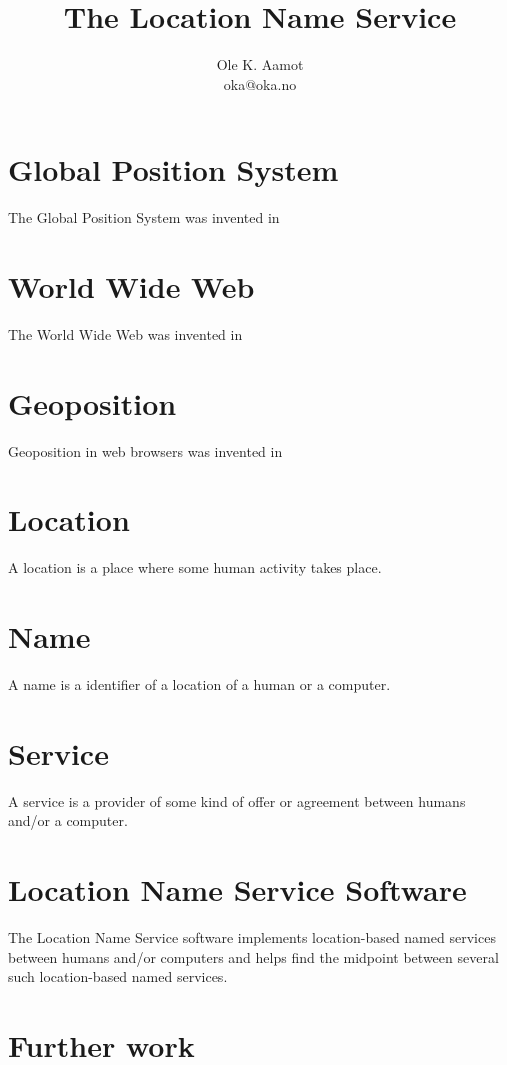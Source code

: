 \documentclass{article}
\begin{document}
\title{The Location Name Service}
\author{Ole K. Aamot\\oka@oka.no}
\section{Global Position System}
The Global Position System was invented in 
\section{World Wide Web}
The World Wide Web was invented in 
\section{Geoposition}
Geoposition in web browsers was invented in 
\section{Location}
A location is a place where some human activity takes place.
\section{Name}
A name is a identifier of a location of a human or a computer.
\section{Service}
A service is a provider of some kind of offer or agreement between humans and/or a computer.
\section{Location Name Service Software}
The Location Name Service software implements location-based named services 
between humans and/or computers and helps find the midpoint between several
such location-based named services.
\section{Further work}
\maketitle
\end{document}
